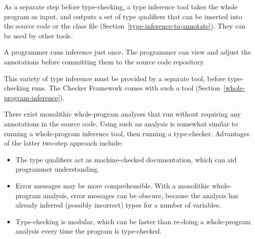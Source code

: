 
As a separate step before type-checking, a type inference tool takes the
whole program as input, and outputs a set of type qualifiers that can be
inserted into the source code or the class file
(Section~\ref{type-inference-to-annotate}).  They can be used by other
tools.

A programmer runs inference just once.  The programmer can view and adjust the
annotations before committing them to the source code repository.

This variety of type inference must be provided by a separate tool,
before type-checking runs.  The Checker Framework comes with such a tool
(Section~\ref{whole-program-inference}).

There exist monolithic whole-program analyses that run without requiring any
annotations in the source code.  Using such an analysis is somewhat similar
to running a whole-program inference tool, then running a type-checker.
Advantages of the latter two-step approach include:
\begin{itemize}
\item
  The type qualifiers act as machine-checked documentation,
  which can aid programmer understanding.
\item
  Error messages may be more comprehensible.  With a monolithic
  whole-program analysis, error messages can be obscure, because the
  analysis has already inferred (possibly incorrect) types for a number of
  variables.
\item
  Type-checking is modular, which can be faster than re-doing a
  whole-program analysis every time the program is type-checked.
\end{itemize}



